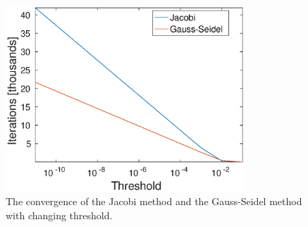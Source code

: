 \begin{figure}
\centering
\includegraphics[width = 0.8\textwidth]{fig/itd_jac_gs.eps}
\caption{The convergence of the Jacobi method and the Gauss-Seidel method with changing threshold.}
\label{fig:itd}
\end{figure}

